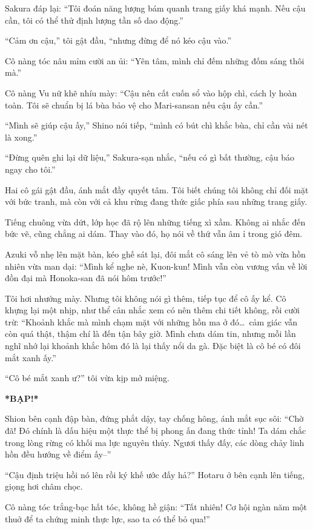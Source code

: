 \documentclass[../main.tex]{subfiles}
\begin{document}
Sakura đáp lại: ``Tôi đoán năng lượng bám quanh trang giấy khá mạnh. Nếu cậu cần, tôi có thể thử định lượng tần số dao động.''

``Cảm ơn cậu,'' tôi gật đầu, ``nhưng đừng để nó kéo cậu vào.''

Cô nàng tóc nâu mỉm cười an ủi: ``Yên tâm, mình chỉ đếm những đốm sáng thôi mà.''

Cô nàng Vu nữ khẽ nhíu mày: ``Cậu nên cất cuốn sổ vào hộp chì, cách ly hoàn toàn. Tôi sẽ chuẩn bị lá bùa bảo vệ cho Mari-sansan nếu cậu ấy cần.''

``Mình sẽ giúp cậu ấy,'' Shino nói tiếp, ``mình có bút chì khắc bùa, chỉ cần vài nét là xong.''

``Đừng quên ghi lại dữ liệu,'' Sakura-sạn nhắc, ``nếu có gì bất thường, cậu báo ngay cho tôi.''

Hai cô gái gật đầu, ánh mắt đầy quyết tâm. Tôi biết chúng tôi không chỉ đối mặt với bức tranh, mà còn với cả khu rừng đang thức giấc phía sau những trang giấy.

\ct

Tiếng chuông vừa dứt, lớp học đã rộ lên những tiếng xì xầm. Không ai nhắc đến bức vẽ, cũng chẳng ai dám. Thay vào đó, họ nói về thứ vẫn âm ỉ trong gió đêm.

Azuki vỗ nhẹ lên mặt bàn, kéo ghế sát lại, đôi mắt cô sáng lên vẻ tò mò vừa hồn nhiên vừa man dại: ``Mình kể nghe nè, Kuon-kun! Mình vẫn còn vương vấn về lời đồn đại mà Honoka-san đã nói hôm trước!''

Tôi hơi nhướng mày. Nhưng tôi không nói gì thêm, tiếp tục để cô ấy kể. Cô khựng lại một nhịp, như thể cân nhắc xem có nên thêm chi tiết không, rồi cười trừ: ``Khoảnh khắc mà mình chạm mặt với những hồn ma ở đó\dots\ cảm giác vẫn còn quá thật, thậm chí là đến tận bây giờ. Mình chưa dám tin, nhưng mỗi lần nghĩ nhớ lại khoảnh khắc hôm đó là lại thấy nổi da gà. Đặc biệt là cô bé có đôi mắt xanh ấy.''

``Cô bé mắt xanh ư?'' tôi vừa kịp mở miệng.

\textbf{*BẠP!*}

Shion bên cạnh đập bàn, đứng phắt dậy, tay chống hông, ánh mắt sục sôi: ``Chờ đã! Đó chính là dấu hiệu một thực thể bị phong ấn đang thức tỉnh! Ta dám chắc trong lòng rừng có khối ma lực nguyên thủy. Ngươi thấy đấy, các dòng chảy linh hồn đều hướng về điểm ấy--''

``Cậu định triệu hồi nó lên rồi ký khế ước đấy hả?'' Hotaru ở bên cạnh lên tiếng, giọng hơi châm chọc.

Cô nàng tóc trắng-bạc hất tóc, không hề giận: ``Tất nhiên! Cơ hội ngàn năm một thuở để ta chứng minh thực lực, sao ta có thể bỏ qua!''
\end{document}
